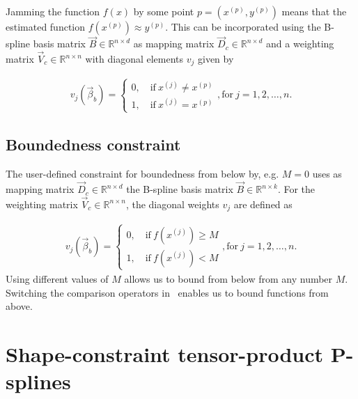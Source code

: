 Jamming the function $f(x)$ by some point $p = (x^{(p)}, y^{(p)})$ means that the estimated function $f(x^{(p)}) \approx y^{(p)}$. This can be incorporated using the B-spline basis matrix $\vec{B} \in \mathbb{R}^{n \times d}$ as mapping matrix $\vec{D}_c \in \mathbb{R}^{n \times d}$ and a weighting matrix $\vec{V}_c \in \mathbb{R}^{n \times n}$ with diagonal elements $v_j$ given by

\begin{align} \label{eq:v_jamming}
	v_j(\vec{\beta}_b) = 
	\begin{cases}
		0, \quad \text{if} \ x^{(j)} \ne x^{(p)} \\
		1, \quad \text{if} \ x^{(j)} = x^{(p)} 
	\end{cases}, \text{for} \ j = 1,2,\dots,n.
\end{align} 

\subsection{Boundedness constraint} \label{subsec:BoudC}

The user-defined constraint for boundedness from below by, e.g. $M=0$ uses as mapping matrix $\vec{D}_c \in \mathbb{R}^{n \times d}$ the B-spline basis matrix $\vec{B} \in \mathbb{R}^{n \times k}$. For the weighting matrix $\vec{V}_c \in \mathbb{R}^{n\times n}$, the diagonal weights $v_j$ are defined as

\begin{align} \label{eq:v_boundedness}
	v_j(\vec{\beta}_b) = \begin{cases} 
		0, \quad \text{if} \ f(x^{(j)}) \ge M\\ 
		1, \quad \text{if} \ f(x^{(j)})  < M 		
	\end{cases}, \text{for} \ j=1,2,\dots,n.
\end{align}
%
Using different values of $M$ allows us to bound from below from any number $M$. Switching the comparison operators in~ enables us to bound functions from above. 


\section{Shape-constraint tensor-product P-splines}\label{sec:SCP-tp-splines}

